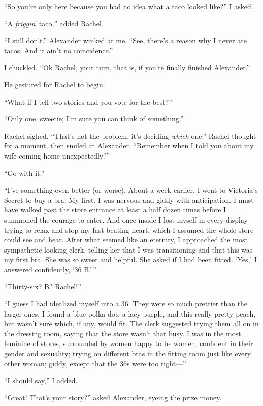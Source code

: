 ``So you're only here because you had no idea what a taco looked like?''
I asked.

``A \emph{friggin'} taco,'' added Rachel.

``I still don't.'' Alexander winked at me. ``See, there's a reason why I
never ate tacos. And it ain't no coincidence.''

I chuckled. ``Ok Rachel, your turn, that is, if you're finally finished
Alexander.''

He gestured for Rachel to begin.

``What if I tell two stories and you vote for the best?''

``Only one, sweetie; I'm sure you can think of something.''

Rachel sighed. ``That's not the problem, it's deciding \emph{which}
one.'' Rachel thought for a moment, then smiled at Alexander. ``Remember
when I told you about my wife coming home unexpectedly?''

``Go with it.''

``I've something even better (or worse). About a week earlier, I went to
Victoria's Secret to buy a bra. My first. I was nervous and giddy with
anticipation. I must have walked past the store entrance at least a half
dozen times before I summoned the courage to enter. And once inside I
lost myself in every display trying to relax and stop my fast-beating
heart, which I assumed the whole store could see and hear. After what
seemed like an eternity, I approached the most sympathetic-looking
clerk, telling her that I was transitioning and that this was my first
bra. She was so sweet and helpful. She asked if I had been fitted.
`Yes,' I answered confidently, `36 B.'\,''

``Thirty-six? B? Rachel!''

``I guess I had idealized myself into a 36. They were so much prettier
than the larger ones. I found a blue polka dot, a lacy purple, and this
really pretty peach, but wasn't sure which, if any, would fit. The clerk
suggested trying them all on in the dressing room, saying that the store
wasn't that busy. I was in the most feminine of stores, surrounded by
women happy to be women, confident in their gender and sexuality; trying
on different bras in the fitting room just like every other woman;
giddy, except that the 36s were too tight---''

``I should say,'' I added.

``Great! That's your story?'' asked Alexander, eyeing the prize money.

